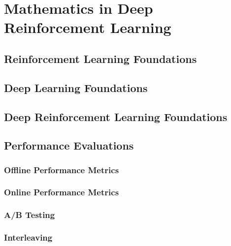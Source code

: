 %
%
%
\chapter{Mathematics in Deep Reinforcement Learning}
\label{intro} %

\abstract{}
\section{Reinforcement Learning Foundations}

\section{Deep Learning Foundations}

\section{Deep Reinforcement Learning Foundations}

\section{Performance Evaluations}


\subsection{Offline Performance Metrics}
\subsection{Online Performance Metrics}
\subsection{A/B Testing}
\subsection{Interleaving}

